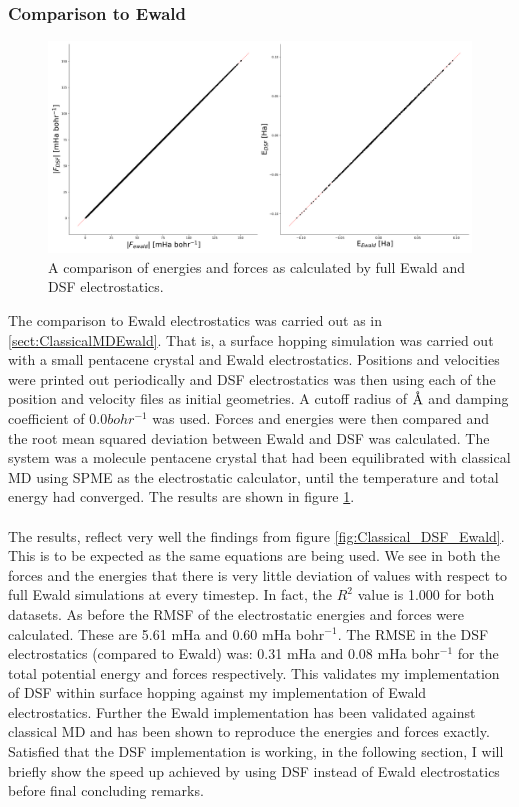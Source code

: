 \subsubsection{Comparison to Ewald}
\begin{figure}[htp]
  \includegraphics[width=\textwidth]{../img/ES/DSF_vs_Ewald_FSSH.png}
  \caption{\label{fig:DSF_vs_EwaldSH}A comparison of energies and forces as calculated by full Ewald and DSF electrostatics.}
\end{figure}
The comparison to Ewald electrostatics was carried out as in \ref{sect:ClassicalMDEwald}. That is, a surface hopping simulation was carried out with a small pentacene crystal and Ewald electrostatics. Positions and velocities were printed out periodically and DSF electrostatics was then  using each of the position and velocity files as initial geometries. A cutoff radius of $\text{\normalfont\AA}$ and damping coefficient of 0.0$bohr^{-1}$ was used. Forces and energies were then compared and the root mean squared deviation between Ewald and DSF was calculated. The system was a  molecule pentacene crystal that had been equilibrated with classical MD using SPME as the electrostatic calculator, until the temperature and total energy had converged. The results are shown in figure \ref{fig:DSF_vs_EwaldSH}. 
\\\\
The results, reflect very well the findings from figure \ref{fig:Classical_DSF_Ewald}. This is to be expected as the same equations are being used. We see in both the forces and the energies that there is very little deviation of values with respect to full Ewald simulations at every timestep. In fact, the $R^2$ value is 1.000 for both datasets. As before the RMSF of the electrostatic energies and forces were calculated. These are 5.61 mHa and 0.60 mHa bohr$^{-1}$. The RMSE in the DSF electrostatics (compared to Ewald) was: 0.31 mHa and 0.08 mHa bohr$^{-1}$ for the total potential energy and forces respectively. This validates my implementation of DSF within surface hopping against my implementation of Ewald electrostatics. Further the Ewald implementation has been validated against classical MD and has been shown to reproduce the energies and forces exactly. Satisfied that the DSF implementation is working, in the following section, I will briefly show the speed up achieved by using DSF instead of Ewald electrostatics before final concluding remarks.

